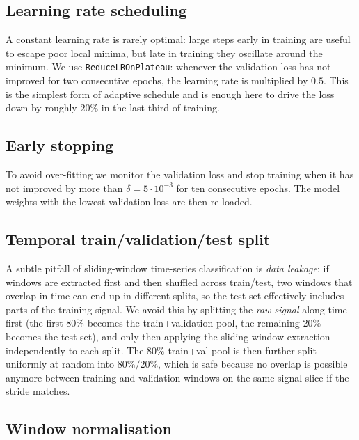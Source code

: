 \subsection{Learning rate scheduling}
\label{sec:sched-theory}

A constant learning rate is rarely optimal: large steps early in
training are useful to escape poor local minima, but late in training
they oscillate around the minimum. We use
\texttt{ReduceLROnPlateau}: whenever the validation loss has not
improved for two consecutive epochs, the learning rate is multiplied by
$0.5$. This is the simplest form of adaptive schedule and is enough
here to drive the loss down by roughly $20\%$ in the last third of
training.

\subsection{Early stopping}
\label{sec:es-theory}

To avoid over-fitting we monitor the validation loss and stop training
when it has not improved by more than $\delta=5\cdot 10^{-3}$ for ten
consecutive epochs. The model weights with the lowest validation loss
are then re-loaded.

\subsection{Temporal train/validation/test split}
\label{sec:split-theory}

A subtle pitfall of sliding-window time-series classification is
\emph{data leakage}: if windows are extracted first and then shuffled
across train/test, two windows that overlap in time can end up in
different splits, so the test set effectively includes parts of the
training signal. We avoid this by splitting the \emph{raw signal}
along time first (the first $80\%$ becomes the train+validation pool,
the remaining $20\%$ becomes the test set), and only then applying the
sliding-window extraction independently to each split. The
$80\%$ train+val pool is then further split uniformly at random into
$80\%/20\%$, which is safe because no overlap is possible anymore
between training and validation windows on the same signal slice if
the stride matches.

\subsection{Window normalisation}
\label{sec:norm-theory}

